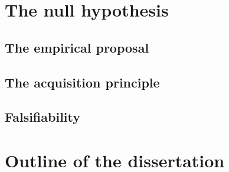 
\section{The null hypothesis}

\subsection{The empirical proposal}

\subsection{The acquisition principle}

\subsection{Falsifiability}


\section{Outline of the dissertation}

